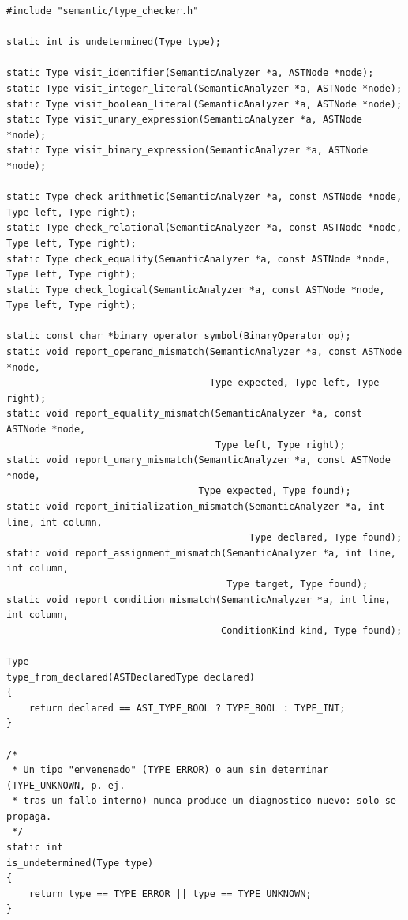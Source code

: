 \documentclass[12pt,letterpaper]{article}
\begin{document}
\begin{lstlisting}[style=modernc, caption={\texttt{type\_checker.c}: prototipos, \texttt{type\_from\_declared} e \texttt{is\_undetermined}.}]
#include "semantic/type_checker.h"

static int is_undetermined(Type type);

static Type visit_identifier(SemanticAnalyzer *a, ASTNode *node);
static Type visit_integer_literal(SemanticAnalyzer *a, ASTNode *node);
static Type visit_boolean_literal(SemanticAnalyzer *a, ASTNode *node);
static Type visit_unary_expression(SemanticAnalyzer *a, ASTNode *node);
static Type visit_binary_expression(SemanticAnalyzer *a, ASTNode *node);

static Type check_arithmetic(SemanticAnalyzer *a, const ASTNode *node, Type left, Type right);
static Type check_relational(SemanticAnalyzer *a, const ASTNode *node, Type left, Type right);
static Type check_equality(SemanticAnalyzer *a, const ASTNode *node, Type left, Type right);
static Type check_logical(SemanticAnalyzer *a, const ASTNode *node, Type left, Type right);

static const char *binary_operator_symbol(BinaryOperator op);
static void report_operand_mismatch(SemanticAnalyzer *a, const ASTNode *node,
                                    Type expected, Type left, Type right);
static void report_equality_mismatch(SemanticAnalyzer *a, const ASTNode *node,
                                     Type left, Type right);
static void report_unary_mismatch(SemanticAnalyzer *a, const ASTNode *node,
                                  Type expected, Type found);
static void report_initialization_mismatch(SemanticAnalyzer *a, int line, int column,
                                           Type declared, Type found);
static void report_assignment_mismatch(SemanticAnalyzer *a, int line, int column,
                                       Type target, Type found);
static void report_condition_mismatch(SemanticAnalyzer *a, int line, int column,
                                      ConditionKind kind, Type found);

Type
type_from_declared(ASTDeclaredType declared)
{
    return declared == AST_TYPE_BOOL ? TYPE_BOOL : TYPE_INT;
}

/*
 * Un tipo "envenenado" (TYPE_ERROR) o aun sin determinar (TYPE_UNKNOWN, p. ej.
 * tras un fallo interno) nunca produce un diagnostico nuevo: solo se propaga.
 */
static int
is_undetermined(Type type)
{
    return type == TYPE_ERROR || type == TYPE_UNKNOWN;
}
\end{lstlisting}
\end{document}
